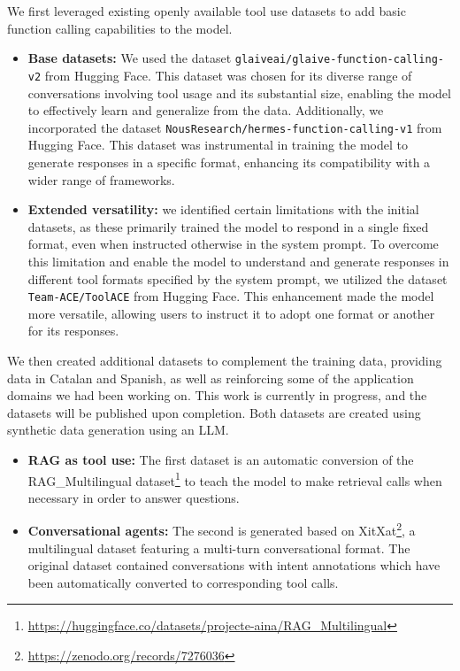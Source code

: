 We first leveraged existing openly available tool use datasets to add basic function calling capabilities to the model.

\begin{itemize}
    \item \textbf{Base datasets:} We used the dataset \texttt{glaiveai/glaive-function-calling-v2} from Hugging Face. This dataset was chosen for its diverse range of conversations involving tool usage and its substantial size, enabling the model to effectively learn and generalize from the data. 
    Additionally, we incorporated the dataset \texttt{NousResearch/hermes-function-calling-v1} from Hugging Face. This dataset was instrumental in training the model to generate responses in a specific format, enhancing its compatibility with a wider range of frameworks.
\end{itemize}

\begin{itemize}
    \item \textbf{Extended versatility:} we identified certain limitations with the initial datasets, as these primarily trained the model to respond in a single fixed format, even when instructed otherwise in the system prompt. To overcome this limitation and enable the model to understand and generate responses in different tool formats specified by the system prompt, we utilized the dataset \texttt{Team-ACE/ToolACE} from Hugging Face. This enhancement made the model more versatile, allowing users to instruct it to adopt one format or another for its responses.
\end{itemize}

We then created additional datasets to complement the training data, providing data in Catalan and Spanish, as well as reinforcing some of the application domains we had been working on. This work is currently in progress, and the datasets will be published upon completion. Both datasets are created using synthetic data generation using an LLM.

\begin{itemize}
    \item \textbf{RAG as tool use:} The first dataset is an automatic conversion of the RAG\_Multilingual dataset\footnote{\url{https://huggingface.co/datasets/projecte-aina/RAG_Multilingual}} to teach the model to make retrieval calls when necessary in order to answer questions.
    \item \textbf{Conversational agents:} The second is generated based on XitXat\footnote{\url{https://zenodo.org/records/7276036}}\cite{carme_armentano_oller_2022_7276036}, a multilingual dataset featuring a multi-turn conversational format. The original dataset contained conversations with intent annotations which have been automatically converted to corresponding tool calls.
\end{itemize}

